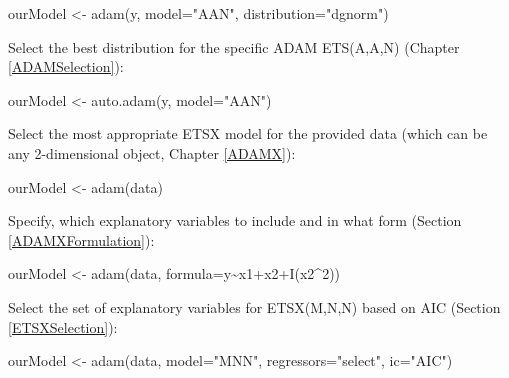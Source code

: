 \documentclass[
]{book}
\newenvironment{Shaded}{\begin{snugshade}}{\end{snugshade}}
\newcommand{\AttributeTok}[1]{\textcolor[rgb]{0.77,0.63,0.00}{#1}}
\newcommand{\DecValTok}[1]{\textcolor[rgb]{0.00,0.00,0.81}{#1}}
\newcommand{\FunctionTok}[1]{\textcolor[rgb]{0.00,0.00,0.00}{#1}}
\newcommand{\NormalTok}[1]{#1}
\newcommand{\OtherTok}[1]{\textcolor[rgb]{0.56,0.35,0.01}{#1}}
\newcommand{\SpecialCharTok}[1]{\textcolor[rgb]{0.00,0.00,0.00}{#1}}
\newcommand{\StringTok}[1]{\textcolor[rgb]{0.31,0.60,0.02}{#1}}
\theoremstyle{definition}
\theoremstyle{definition}
\theoremstyle{definition}
\theoremstyle{definition}
\theoremstyle{remark}
\begin{document}
\begin{Shaded}
\begin{Highlighting}[]
\NormalTok{ourModel }\OtherTok{\textless{}{-}} \FunctionTok{adam}\NormalTok{(y, }\AttributeTok{model=}\StringTok{"AAN"}\NormalTok{, }\AttributeTok{distribution=}\StringTok{"dgnorm"}\NormalTok{)}
\end{Highlighting}
\end{Shaded}

Select the best distribution for the specific ADAM ETS(A,A,N) (Chapter \ref{ADAMSelection}):

\begin{Shaded}
\begin{Highlighting}[]
\NormalTok{ourModel }\OtherTok{\textless{}{-}} \FunctionTok{auto.adam}\NormalTok{(y, }\AttributeTok{model=}\StringTok{"AAN"}\NormalTok{)}
\end{Highlighting}
\end{Shaded}

Select the most appropriate ETSX model for the provided data (which can be any 2-dimensional object, Chapter \ref{ADAMX}):

\begin{Shaded}
\begin{Highlighting}[]
\NormalTok{ourModel }\OtherTok{\textless{}{-}} \FunctionTok{adam}\NormalTok{(data)}
\end{Highlighting}
\end{Shaded}

Specify, which explanatory variables to include and in what form (Section \ref{ADAMXFormulation}):

\begin{Shaded}
\begin{Highlighting}[]
\NormalTok{ourModel }\OtherTok{\textless{}{-}} \FunctionTok{adam}\NormalTok{(data, }\AttributeTok{formula=}\NormalTok{y}\SpecialCharTok{\textasciitilde{}}\NormalTok{x1}\SpecialCharTok{+}\NormalTok{x2}\SpecialCharTok{+}\FunctionTok{I}\NormalTok{(x2}\SpecialCharTok{\^{}}\DecValTok{2}\NormalTok{))}
\end{Highlighting}
\end{Shaded}

Select the set of explanatory variables for ETSX(M,N,N) based on AIC (Section \ref{ETSXSelection}):

\begin{Shaded}
\begin{Highlighting}[]
\NormalTok{ourModel }\OtherTok{\textless{}{-}} \FunctionTok{adam}\NormalTok{(data, }\AttributeTok{model=}\StringTok{"MNN"}\NormalTok{,}
                 \AttributeTok{regressors=}\StringTok{"select"}\NormalTok{, }\AttributeTok{ic=}\StringTok{"AIC"}\NormalTok{)}
\end{Highlighting}
\end{Shaded}
\end{document}
